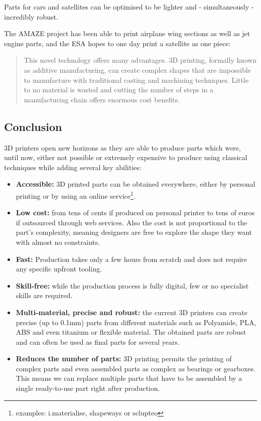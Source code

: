 Parts for cars and satellites can be optimised to be lighter and - simultaneously - incredibly robust.

The AMAZE project has been able to print airplane wing sections as well as jet engine parts, and the ESA hopes to one day print a satellite as one piece:
\begin{quotation}
    This novel technology offers many advantages. 3D printing, formally known as additive manufacturing, can create complex shapes that are impossible to manufacture with traditional casting and machining techniques. Little to no material is wasted and cutting the number of steps in a manufacturing chain offers enormous cost benefits.
\end{quotation}




\subsection{Conclusion} %

3D printers open new horizons as they are able to produce parts which were, until now, either not possible or extremely expensive to produce using classical techniques while adding several key abilities:
\begin{itemize}
    \item \textbf{Accessible:} 3D printed parts can be obtained everywhere, either by personal printing or by using an online service\footnote{examples: i.materialise, shapeways or sclupteo}.
    \item \textbf{Low cost:}  from tens of cents if produced on personal printer to tens of euros if outsourced through web services. Also the cost is not proportional to the part’s complexity, meaning designers are free to explore the shape they want with almost no constraints.
    \item \textbf{Fast:} Production takes only a few hours from scratch and does not require any specific upfront tooling.
    \item \textbf{Skill-free:} while the production process is fully digital, few or no specialist skills are required.
    \item \textbf{Multi-material, precise and robust:} the current 3D printers can create precise (up to 0.1mm) parts from different materials such as Polyamide, PLA, ABS and even titanium or flexible material. The obtained parts are robust and can often be used as final parts for several years.
    \item \textbf{Reduces the number of parts:} 3D printing permits the printing of complex parts and even assembled parts as complex as bearings or gearboxes. This means we can replace multiple parts that have to be assembled by a single ready-to-use part right after production.
\end{itemize}



